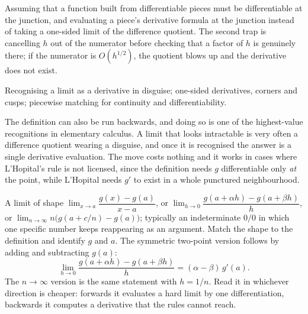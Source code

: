 \begin{trap}
Assuming that a function built from differentiable pieces must be differentiable at the junction, and evaluating a piece's derivative formula at the junction instead of taking a one-sided limit of the difference quotient. The second trap is cancelling $h$ out of the numerator before checking that a factor of $h$ is genuinely there; if the numerator is $O(h^{1/2})$, the quotient blows up and the derivative does not exist.
\end{trap}

\begin{seealsob}Recognising a limit as a derivative in disguise; one-sided derivatives, corners and cusps; piecewise matching for continuity and differentiability.\end{seealsob}

The definition can also be run backwards, and doing so is one of the highest-value recognitions in elementary calculus. A limit that looks intractable is very often a difference quotient wearing a disguise, and once it is recognised the answer is a single derivative evaluation. The move costs nothing and it works in cases where L'Hopital's rule is not licensed, since the definition needs $g$ differentiable only \emph{at} the point, while L'Hopital needs $g'$ to exist in a whole punctured neighbourhood.

\cue A limit of shape $\lim_{x\to a}\dfrac{g(x)-g(a)}{x-a}$, or $\lim_{h\to0}\dfrac{g(a+\alpha h)-g(a+\beta h)}{h}$, or $\lim_{n\to\infty}n\bigl(g(a+c/n)-g(a)\bigr)$; typically an indeterminate $0/0$ in which one specific number keeps reappearing as an argument.
\method Match the shape to the definition and identify $g$ and $a$. The symmetric two-point version follows by adding and subtracting $g(a)$:
\[
\lim_{h\to0}\frac{g(a+\alpha h)-g(a+\beta h)}{h}=(\alpha-\beta)\,g'(a).
\]
The $n\to\infty$ version is the same statement with $h=1/n$. Read it in whichever direction is cheaper: forwards it evaluates a hard limit by one differentiation, backwards it computes a derivative that the rules cannot reach.


